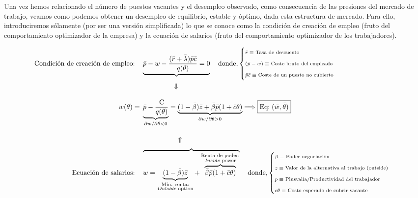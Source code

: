 \documentclass[10pt,a4paper]{article}
\begin{document}
{Una vez hemos relacionado el número de puestos vacantes y el desempleo observado, como consecuencia de las presiones del mercado de trabajo, veamos como podemos obtener un desempleo de equilibrio, estable y óptimo, dada esta estructura de mercado. Para ello, introduciremos sólamente (por ser una versión simplificada) lo que se conoce como la condición de creación de empleo (fruto del comportamiento optimizador de la empresa) y la ecuación de salarios (fruto del comportamiento optimizador de los trabajadores).

$$
\begin{aligned}
    \text{Condición de creación de empleo:}\quad &\underbrace{\bar p-w-\frac{(\bar r+\bar\lambda){\bar p\bar c}}{q(\theta)}=0} \quad \text{donde,}
    \begin{cases}
        \text{\scriptsize$\bar r\equiv$ Tasa de descuento}\\[0.2em]
        \text{\scriptsize$(\bar p-w)\equiv$ Coste bruto del empleado}\\[0.2em]
        \text{\scriptsize$\bar p\bar c\equiv$ Coste de un puesto no cubierto}\\[0.2em]
    \end{cases}\\
    &\hspace{4.4em}\Downarrow\\[1em]
    w(\theta)= \;&\underbrace{\bar p-\frac{\mathrm{C}}{q(\theta)}}_{\partial w/\partial\theta<0}=\underbrace{(1-\bar\beta)\bar z+\bar\beta \bar p(1+\bar c\theta)}_{\partial w/\partial\theta>0}\Longrightarrow \boxed{\text{Eq:}\;(\bar w, \bar\theta)}\\[1em]
    &\hspace{5em}\Uparrow\\
    \text{Ecuación de salarios:}\quad &\overbrace{w=\underbrace{(1-\bar\beta)\bar z}_{\substack{\text{\scriptsize Mín. renta:}\\\text{\scriptsize \textit{Outside} option}}}+\overbrace{\bar\beta \bar p(1+\bar c\theta)}^{\substack{\text{\scriptsize Renta de poder:}\\\text{\scriptsize \textit{Inside} power}}}}^{} \quad \text{donde,}
    \begin{cases}
        \text{\scriptsize$\beta\equiv$ Poder negociación}\\[0.2em]
        \text{\scriptsize$z\equiv$ Valor de la alternativa al trabajo (outside)}\\[0.2em]
        \text{\scriptsize$p\equiv$ Plusvalía/Productividad del trabajador}\\[0.2em]
        \text{\scriptsize$c\theta\equiv$ Costo esperado de cubrir vacante}\\
    \end{cases}
\end{aligned}
$$

}
\end{document}
